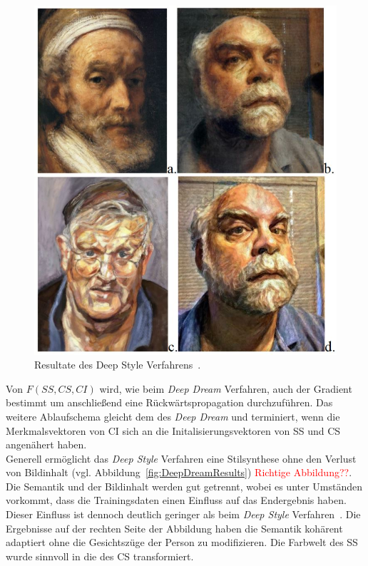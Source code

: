 \documentclass[times, 11pt,twocolumn]{article}
\begin{document}
\begin{figure}
	\flushleft
	\includegraphics[width=\columnwidth]{Bilder/DeepStyleResults.JPG}
	\caption{Resultate des Deep Style Verfahrens~\cite{McCaigDG16}.}
	\label{fig:DeepStyleResults}
\end{figure}
Von $F(SS,CS,CI)$ wird, wie beim \textit{Deep Dream} Verfahren, auch der Gradient bestimmt um anschließend eine Rückwärtspropagation durchzuführen. Das weitere Ablaufschema gleicht dem des \textit{Deep Dream} und terminiert, wenn die Merkmalsvektoren von CI sich an die Initalisierungsvektoren von SS und CS angenähert haben.\\

Generell ermöglicht das \textit{Deep Style} Verfahren eine Stilsynthese ohne den Verlust von Bildinhalt (vgl. Abbildung~\ref{fig:DeepDreamResults}) \textcolor{red}{Richtige Abbildung??}. Die Semantik und der Bildinhalt werden gut getrennt, wobei es unter Umständen vorkommt, dass die Trainingsdaten einen Einfluss auf das Endergebnis haben. Dieser Einfluss ist dennoch deutlich geringer als beim \textit{Deep Style} Verfahren~\cite{McCaigDG16}. Die Ergebnisse auf der rechten Seite der Abbildung haben die Semantik kohärent adaptiert ohne die Gesichtszüge der Person zu modifizieren. Die Farbwelt des SS wurde sinnvoll in die des CS transformiert. 
\end{document}
